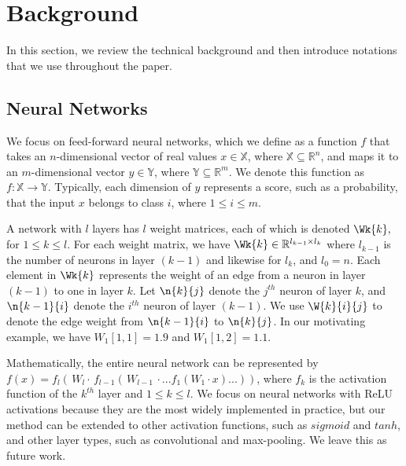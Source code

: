 \section{Background}
\label{neurodiff:sec:preliminary}

In this section, we review the technical background and then introduce
notations that we use throughout the paper.

\subsection{Neural Networks}

We focus on feed-forward neural networks, which we define as a function $ f $ that takes
an $ n $-dimensional vector of real values $x \in \mathbb{X}$, where
$\mathbb{X} \subseteq \mathbb{R}^n $, and maps it to an $ m
$-dimensional vector $ y \in \mathbb{Y}$, where
$\mathbb{Y} \subseteq \mathbb{R}^m $.  We denote this function as $ f
: \mathbb{X} \to \mathbb{Y} $.  Typically, each dimension of $ y $
represents a score, such as a probability, that the input $ x $
belongs to class $ i $, where $ 1 \leq i \leq m $.

A network with $l$ layers has $ l $ weight matrices, each of which is
denoted $ \Wk{k}, $ for $ 1 \leq k \leq l $. For each weight matrix, we
have $ \Wk{k} \in \mathbb{R}^{l_{k-1} \times l_k} $ where $ l_{k-1} $
is the number of neurons in layer $ (k-1) $ and likewise for $ l_k $,
and $ l_0 = n $.
Each element in $ \Wk{k} $ represents the weight of an edge from a
neuron in layer $ (k-1) $ to one in layer $ k $. Let $ \n{k}{j} $
denote the $ j^{th} $ neuron of layer $ k $, and $ \n{k-1}{i} $ denote
the $ i^{th} $ neuron of layer $ (k-1) $.  We use $ \W{k}{i}{j} $ to
denote the edge weight from $ \n{k-1}{i} $ to $ \n{k}{j} $.
%
In our motivating example, we have $ W_1[1,1] = 1.9 $ and $ W_1[1,2] =
1.1 $.

Mathematically, the entire neural network can be represented by $ f(x)
= f_l(\, W_l \cdot \, f_{l-1}( \, W_{l-1} \, \cdot ...f_1(W_1 \cdot
x)...)) $, where $ f_k $ is the activation function of the $
k^{th} $ layer and $1\leq k\leq l$. We focus on neural networks with
ReLU activations because they are the most widely implemented in
practice, but our method can be extended to other activation
functions, such as $sigmoid$ and $tanh$, and other layer types, such
as convolutional and max-pooling. We leave this as future work.

